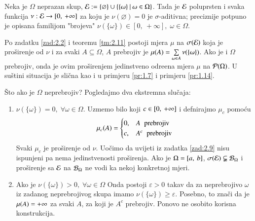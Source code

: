 \begin{nap} \label{nap:2.12}
    Neka je $\Omega$ neprazan skup, $\mathcal{E} := \{\varnothing\} \cup \{{\{ \omega \}} \: | \: {\omega \in \Omega}\}$.
    Tada je $\mathcal{E}$ poluprsten i svaka funkcija $\nu: \mathcal{E} \to [0, \: +\infty]$ za koju je $\nu(\varnothing) = 0$ je $\sigma$-aditivna;
    preciznije potpuno je opisana familijom "brojeva" $\nu(\{ \omega \}) \in [0, \: +\infty], \; \omega \in \Omega$.

    Po zadatku \ref{zad:2.2} i teoremu \ref{tm:2.11} postoji mjera $\mu$ na $\sigma({\mathcal{E}})$ koja je pro\v sirenje od $\nu$ i za svaki $A \subseteq \Omega$, $A$ prebrojiv je $\mu({A}) = \sum\limits_{\omega \in A}^{} \nu(\{ \omega \})$.
    Ako je i $\Omega$ prebrojiv, onda je ovim pro\v sirenjem jedinstveno odre\dj ena mjera $\mu$ na $\mathcal{P}({\Omega})$.
    U su\v stini situacija je sli\v cna kao i u primjeru \ref{pr:1.7} i primjeru \ref{pr:1.14}.

    \v Sto ako je $\Omega$ neprebrojiv?
    Pogledajmo dva ekstremna slu\v caja:
    \begin{enumerate}[label=(\roman*)]
        \item $\nu(\{ \omega \}) = 0, \; \forall \omega \in \Omega$.
        Uzmemo bilo koji $c \in [{0}, \:{+\infty}]$ i defnirajmo $\mu_c$ pomo\' cu
        \begin{equation*}
            \mu_c(A) = 
            \begin{cases}
                0, &A \;\; \textnormal{prebrojiv}\\
                c, &A^c \;\; \textnormal{prebrojiv}
            \end{cases}
        \end{equation*}
        Svaki $\mu_c$ je pro\v sirenje od $\nu$.
        Uo\v cimo da uvijeti iz zadatka \ref{zad:2.9} nisu ispunjeni pa nema jedinstvenosti pro\v sirenja.
        Ako je $\Omega = [{a}, \:{b}]$, $\sigma({\mathcal{E}}) \subsetneqq \mathcal{B}_{\Omega}$ i pro\v sirenje sa $\mathcal{E}$ na $\mathcal{B}_{\Omega}$ ne vodi ka nekoj konkretnoj mjeri.
        \item Ako je $\nu(\{\omega\}) > 0, \; \forall \omega \in \Omega$ Onda postoji $\varepsilon > 0$ takav da za neprebrojivo $\omega$ iz zadanog neprebrojivog skupa imamo $\nu(\{\omega\}) \geq \varepsilon$.
        Posebno, to zna\v ci da je $\mu({A}) = +\infty$ za svaki $A$, za koji je $A^c$ prebrojiv.
        Ponovo ne osobito korisna konstrukcija.
    \end{enumerate}
\end{nap}

